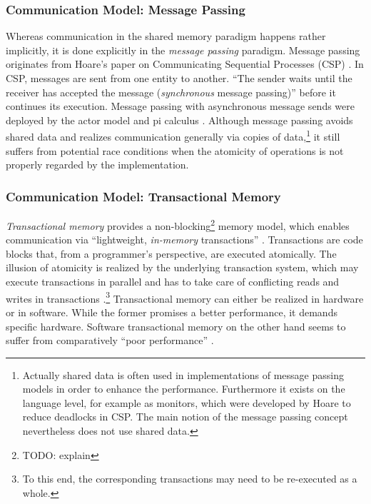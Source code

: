 \subsubsection{Communication Model: Message Passing}
Whereas communication in the shared memory paradigm happens rather implicitly, it is done explicitly in the \textit{message passing} paradigm. Message passing originates from Hoare's paper on Communicating Sequential Processes (CSP) \cite{CommunicatingSequentialProcesses}. In CSP, messages are sent from one entity to another. ``The sender waits until the receiver has accepted the message (\textit{synchronous} message passing)'' \cite[p.~138]{DistributedSharedMemory} before it continues its execution. Message passing with asynchronous message sends were deployed by the actor model \cite{UniversalModularACTORFormalism} and pi calculus \cite{ThePolyadicPi-Calculus}. Although message passing avoids shared data and realizes communication generally via copies of data,\footnote{Actually shared data is often used in implementations of message passing models in order to enhance the performance. Furthermore it exists on the language level, for example as monitors, which were developed by Hoare to reduce deadlocks in CSP. The main notion of the message passing concept nevertheless does not use shared data.} it still suffers from potential race conditions \cite{DebuggingRaceConditions} when the atomicity of operations is not properly regarded by the implementation.

\subsubsection{Communication Model: Transactional Memory}
\textit{Transactional memory} provides a non-blocking\footnote{TODO: explain} memory model, which enables communication via ``lightweight, \textit{in-memory} transactions'' \cite[p.~3]{PrinciplesOfTransactionalMemory}. Transactions are code blocks that, from a programmer's perspective, are executed atomically. The illusion of atomicity is realized by the underlying transaction system, which may execute transactions in parallel and has to take care of conflicting reads and writes in transactions \cite{TransactionalMemory}.\footnote{To this end, the corresponding transactions may need to be re-executed as a whole.} Transactional memory can either be realized in hardware or in software. While the former promises a better performance, it demands specific hardware. Software transactional memory on the other hand seems to suffer from comparatively ``poor performance'' \cite[p.~13]{TransactionalProgrammabilityAndPerformance}.

